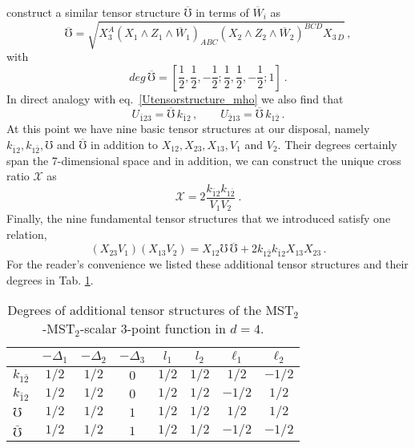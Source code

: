 \documentclass{article}
\def\mK{k}
\begin{document}
construct a similar tensor structure $\overline{\mho}$ in terms of $\overline{W}_i$
as 
\begin{equation}
    \overline{\mho} = \sqrt{X_3^A\left(X_1\wedge Z_1\wedge
    \overline{W}_1\right)_{ABC}\left(X_2\wedge Z_2 \wedge 
    \overline{W}_2\right)^{BCD} X_{3\,D}}\,, 
\end{equation}
with 
\begin{equation} 
\textit{deg}\, \overline{\mho}
=\left[\frac{1}{2},\frac{1}{2},-\frac{1}{2};\frac{1}{2},
\frac{1}{2},-\frac{1}{2};1 \right]\ .
\end{equation} 
In direct analogy with eq.\ \eqref{Utensorstructure_mho} we also find that
\begin{equation}
    U_{\bar{1}23}=\overline{\mho}\, \mK_{\bar{1}2}\,, \qquad
    U_{\bar{2}13}=\overline{\mho}\, \mK_{1\bar{2}}\, . 
    \label{Ubartensorstructure_mhobar}
\end{equation}
At this point we have nine basic tensor structures at our disposal, namely 
$\mK_{\bar{1}2}, \mK_{1\bar{2}}, \mho$ and $\overline{\mho}$ in addition to 
$X_{12}, X_{23}, X_{13}, V_1$ and $V_2$. Their degrees certainly span the 
7-dimensional space and in addition, we can construct the unique cross ratio 
$\mathcal{X}$ as 
\begin{equation}\label{eq:X4d} 
\mathcal{X} = 2 \frac{\mK_{\bar{1}2} \mK_{1\bar{2}}}{V_1 V_2}\ . 
\end{equation} 
Finally, the nine fundamental tensor structures that we introduced satisfy one 
relation,
\begin{equation}
    (X_{23} V_1) (X_{13}V_2) = X_{12}\mho\, \overline{\mho}+
    2\mK_{1\bar{2}}\mK_{\bar{1}2} X_{13} X_{23}\,.
    \label{relationmhobarmho}
\end{equation}
For the reader's convenience we listed these additional tensor structures and their degrees in Tab. \ref{tab:TS_d=4}.

\begin{table}
    \centering
\begin{tabular}{l|c c c c c c c}
    &  $-\Delta_1$ & $-\Delta_2$ & $-\Delta_3$ & $l_1$ & $l_2$ & $\ell_1$ & $\ell_2$ \\
    \midrule
$k_{1\bar{2}}$ & $1/2$ & $1/2$ & $0$ & $1/2$ & $1/2$ & $1/2$ & $-1/2$  \\
$k_{\bar{1}2}$ & $1/2$ & $1/2$ & $0$ & $1/2$ & $1/2$ & $-1/2$ & $1/2$  \\
$\mho$ & $1/2$ & $1/2$ & $1$ & $1/2$ & $1/2$& $1/2$ & $1/2$ \\
$\bar{\mho}$ & $1/2$ & $1/2$ & $1$ & $1/2$ & $1/2$& $-1/2$ & $-1/2$
\end{tabular}
     \caption{Degrees of additional tensor structures of the MST$_2$-MST$_2$-scalar 3-point function in $d=4$.}
    \label{tab:TS_d=4}
\end{table}
\end{document}
